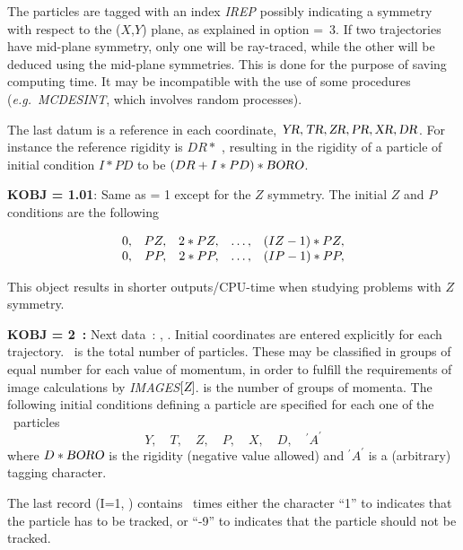 \noindent The particles are tagged with an index \textsl{IREP} possibly
indicating a symmetry  with respect to the ($ X$,$Y$) plane, as explained in option 
\mbox{\KOBJ= 3}. If two trajectories have mid-plane symmetry, only one  will be 
ray-traced, while the other will be deduced using the mid-plane 
symmetries. This is done for the purpose of saving computing time. It may 
be incompatible with the use of some procedures (\emph{e.g.}~\textsl{MCDESINT}, which 
involves random processes). 

\noindent The last datum is a reference in each coordinate, $\textsl{YR},\textsl{TR},\textsl{ZR},\textsl{PR},\textsl{XR},\textsl{DR}$. 
For instance the reference rigidity is $ DR \ast$ \BORO, resulting 
 in the rigidity of a particle of initial condition $ I\ast PD $ to be 
$ (DR+I\ast PD)\ast \textsl{BORO}$. 

\bigskip

\noindent\textbf{KOBJ = 1.01}: Same as \KOBJ = 1    except for the $ Z $
symmetry.  The initial $ Z $ and $ P $ conditions are the following 

$$
  \begin{array}{*{5}{r<{,}}}
	  0  &  PZ &   2  \ast   PZ & \ldots & (IZ-1)   \ast   PZ \\
	  0  &  PP &   2 \ast   PP  & \ldots & (IP-1)   \ast   PP 
  \end{array}
 $$


\noindent This object results in shorter outputs/CPU-time when studying problems with $Z $ symmetry.  

\bigskip

\noindent\textbf{KOBJ = 2~:}  Next data~: \IMAX{},  
\IDMAX{}. Initial coordinates
are entered explicitly for each 
trajectory.  \IMAX\  is the total number of particles.  
These may be classified in groups of equal number for each value of momentum, in order to 
fulfill the requirements of image calculations by \textsl{IMAGES$[\textsl{Z}]$}. 
 \IDMAX{} is the 
number of groups of momenta.  The  following initial 
conditions defining a particle are specified for each one of the \IMAX\  
 particles
 $$ Y,\quad T,\quad Z,\quad P, \quad X, \quad D,\quad ^\prime A^\prime $$
%
 where $ D\ast \textsl{BORO}$ is the rigidity (negative value   
 allowed) and $ ^\prime A^\prime $ is a
(arbitrary) tagging character.   


\smallskip

\noindent The last record \IEX{} (I=1, \IMAX)  contains 
\IMAX\  times either the character  ``1'' to indicates that the particle has to  be
tracked,  or ``-9''  to indicates that the particle should not be tracked.  

